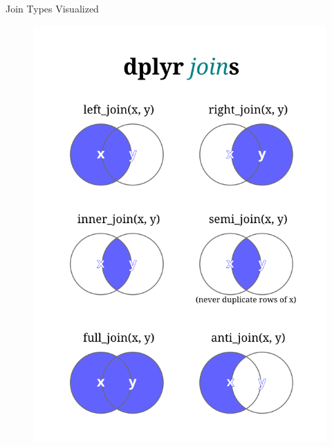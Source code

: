 \documentclass[12pt,aspectratio=169]{beamer}
\begin{document}
\begin{frame}{Join Types Visualized}
    \begin{figure}
        \centering
        \includegraphics[width=0.8\linewidth, height=0.8\textheight, keepaspectratio]{resources/dplyr_joins.png}
    \end{figure}
\end{frame}
\end{document}
